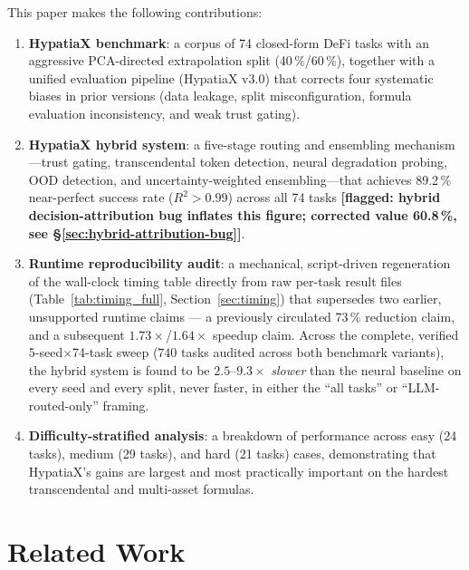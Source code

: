 \documentclass[twoside,11pt]{article}
\newcommand{\Rsq}{R^{2}}
\begin{document}
This paper makes the following contributions:

\begin{enumerate}[leftmargin=2em,label=(\roman*)]
  \item \textbf{HypatiaX benchmark}: a corpus of 74 closed-form DeFi tasks
    with an aggressive PCA-directed extrapolation split (40\,\%/60\,\%), together
    with a unified evaluation pipeline (HypatiaX v3.0) that corrects four
    systematic biases in prior versions (data leakage, split misconfiguration,
    formula evaluation inconsistency, and weak trust gating).

  \item \textbf{HypatiaX hybrid system}: a five-stage routing and ensembling
    mechanism---trust gating, transcendental token detection, neural degradation
    probing, OOD detection, and uncertainty-weighted ensembling---that achieves
    89.2\,\% near-perfect success rate ($\Rsq>0.99$) across all 74 tasks
    \textbf{[flagged: hybrid decision-attribution bug inflates this figure;
    corrected value 60.8\,\%, see \S\ref{sec:hybrid-attribution-bug}]}.

  \item \textbf{Runtime reproducibility audit}: a mechanical, script-driven
    regeneration of the wall-clock timing table directly from raw per-task
    result files (Table~\ref{tab:timing_full}, Section~\ref{sec:timing})
    that supersedes two earlier, unsupported runtime claims --- a
    previously circulated 73\,\% reduction claim, and a subsequent
    $1.73\times$/$1.64\times$ speedup claim. Across the complete, verified
    5-seed$\times$74-task sweep ($740$ tasks audited across both benchmark
    variants), the hybrid system is found to be $2.5$--$9.3\times$
    \emph{slower} than the neural baseline on every seed and every split,
    never faster, in either the ``all tasks'' or ``LLM-routed-only''
    framing.

  \item \textbf{Difficulty-stratified analysis}: a breakdown of performance across
    easy (24 tasks), medium (29 tasks), and hard (21 tasks) cases, demonstrating
    that HypatiaX's gains are largest and most practically important on the hardest
    transcendental and multi-asset formulas.
\end{enumerate}

\section{Related Work}
\label{sec:related}
\end{document}
